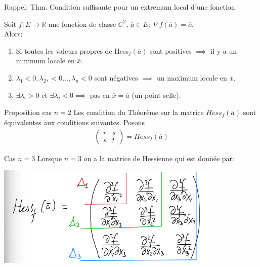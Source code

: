 
\begin{parag}{Rappel: Thm. Condition suffisante pour un extremum local d'une fonction}
    \begin{theoreme}
        Soit $f: E \to \mathbb{R}$ une fonction de classe $C^2$, $\overline{a} \in E: \; \nabla f \left( \overline{a}\right) = \overline{o}$.\\
        Alors:
        \begin{enumerate}
            \item Si toutes les valeurs propres de Hess$_f\left(\overline{a}\right)$ sont positives $ \implies$ il y a un minimum locale en $\overline{x}$.
            \item $\lambda_1 < 0 , \lambda_2, < 0 \ldots, \lambda_n < 0$ sont négatives $\implies$ un maximum locale en $\overline{x}$.
            \item $\exists \lambda_i > 0$ et $\exists \lambda_j < 0 \implies$ pas  en $\overline{x} = \overline{a}$ (un point selle).
        \end{enumerate}
    \end{theoreme}
    
\end{parag}
\begin{parag}{Proposition cas $n = 2$}
    Les condition du Théorème sur la matrice $Hess_f\left(\overline{a}\right)$ sont équivalentes aux conditions suivantes. Posons  
    \begin{align*} \begin{pmatrix} r & s \\ s & t \end{pmatrix} = Hess_f\left(\overline{a}\right) \end{align*}

\end{parag}
\begin{parag}{Cas $n= 3$}
    Lorsque $n = 3$ on a la matrice de Hessienne qui est donnée par:
    \begin{center}
        \includegraphics[scale=1.2]{12025-04-30.png}
    \end{center}
\end{parag}


